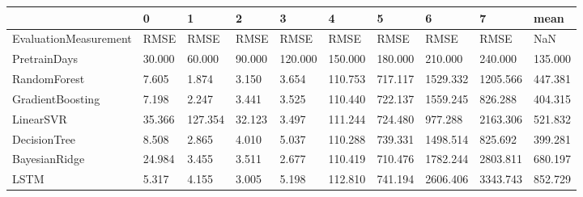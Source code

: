 \begin{tabular}{llllllllll}
\toprule
{} &      0 &       1 &      2 &       3 &       4 &       5 &        6 &        7 &    mean \\
\midrule
EvaluationMeasurement &   RMSE &    RMSE &   RMSE &    RMSE &    RMSE &    RMSE &     RMSE &     RMSE &     NaN \\
PretrainDays          & 30.000 &  60.000 & 90.000 & 120.000 & 150.000 & 180.000 &  210.000 &  240.000 & 135.000 \\
RandomForest          &  7.605 &   1.874 &  3.150 &   3.654 & 110.753 & 717.117 & 1529.332 & 1205.566 & 447.381 \\
GradientBoosting      &  7.198 &   2.247 &  3.441 &   3.525 & 110.440 & 722.137 & 1559.245 &  826.288 & 404.315 \\
LinearSVR             & 35.366 & 127.354 & 32.123 &   3.497 & 111.244 & 724.480 &  977.288 & 2163.306 & 521.832 \\
DecisionTree          &  8.508 &   2.865 &  4.010 &   5.037 & 110.288 & 739.331 & 1498.514 &  825.692 & 399.281 \\
BayesianRidge         & 24.984 &   3.455 &  3.511 &   2.677 & 110.419 & 710.476 & 1782.244 & 2803.811 & 680.197 \\
LSTM                  &  5.317 &   4.155 &  3.005 &   5.198 & 112.810 & 741.194 & 2606.406 & 3343.743 & 852.729 \\
\bottomrule
\end{tabular}
